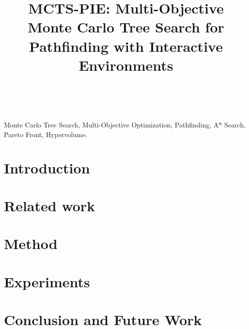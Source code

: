 \documentclass[lettersize,journal]{IEEEtran}
\theoremstyle{definition}
\begin{document}
\title{MCTS-PIE: Multi-Objective Monte Carlo Tree Search for\\ Pathfinding with Interactive Environments}


\author{
  \\
}

\maketitle


\begin{abstract}
  
\end{abstract}

\begin{IEEEkeywords}
  Monte Carlo Tree Search, Multi-Objective Optimization, Pathfinding, A* Search, Pareto Front, Hypervolume.
\end{IEEEkeywords}

\section{Introduction}
\label{sec:intro}


\section{Related work}
\label{sec:related_work}


\newpage
\section{Method}
\label{sec:method}


\newpage
\section{Experiments}
\label{sec:exp}


\section{Conclusion and Future Work}
\label{sec:future_work}





\clearpage
\onecolumn
\end{document}
